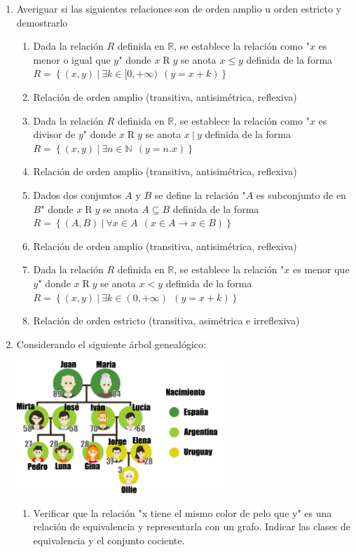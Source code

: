 \documentclass[a4paper]{article}
\newcommand{\answer}{\item[**]}
\newcommand{\exercise}{\item}
\begin{document}
\begin{enumerate}
\begin{enumerate} [label=(\alph*)]
	\end{enumerate}


	\exercise Averiguar si las siguientes relaciones son de orden amplio u orden estricto y demostrarlo
	\begin{enumerate} [label=(\alph*)]
		\item Dada la relación $R$ definida en $\mathbb{R}$, se establece la relación como "$x$ es menor o igual que $y$" donde $x\mathrel{R}y$ se anota $x\leq y$ definida de la forma $R = \left\lbrace (x,y) ~|~ \exists k \in [0,+\infty) ~~( y=x+k ) \right\rbrace$
		\answer Relación de orden amplio (transitiva, antisimétrica, reflexiva) 

		\item Dada la relación $R$ definida en $\mathbb{R}$, se establece la relación como "$x$ es divisor de $y$" donde $x\mathrel{R}y$ se anota $x~|~y$ definida de la forma $R = \left\lbrace (x,y) ~|~ \exists n \in \mathbb{N} ~~( y=n.x ) \right\rbrace$
		\answer Relación de orden amplio (transitiva, antisimétrica, reflexiva)

		\item Dados dos conjuntos $A$ y $B$ se define la relación "$A$ es subconjunto de en $B$" donde $x\mathrel{R}y$ se anota $A\subseteq B$ definida de la forma $R = \left\lbrace (A,B) ~|~ \forall x \in A ~~( x\in A \to x\in B) \right\rbrace$
		\answer Relación de orden amplio (transitiva, antisimétrica, reflexiva)
		
		\item Dada la relación $R$ definida en $\mathbb{R}$, se establece la relación "$x$ es menor que $y$" donde $x\mathrel{R}y$ se anota $x<y$ definida de la forma $R = \left\lbrace (x,y) ~|~ \exists k \in (0,+\infty) ~~(y=x+k)  \right\rbrace$
		\answer Relación de orden estricto (transitiva, asimétrica e irreflexiva)
	\end{enumerate}


	\exercise Considerando el siguiente árbol genealógico: \\ \begin{center} \includegraphics[height=5cm]{familia.png} \end{center}
	\begin{enumerate} [label=(\alph*)]
		\item Verificar que la relación "x tiene el mismo color de pelo que y" es una relación de equivalencia y representarla con un grafo. Indicar las clases de equivalencia y el conjunto cociente.


\end{enumerate}
\end{enumerate}
\end{document}
